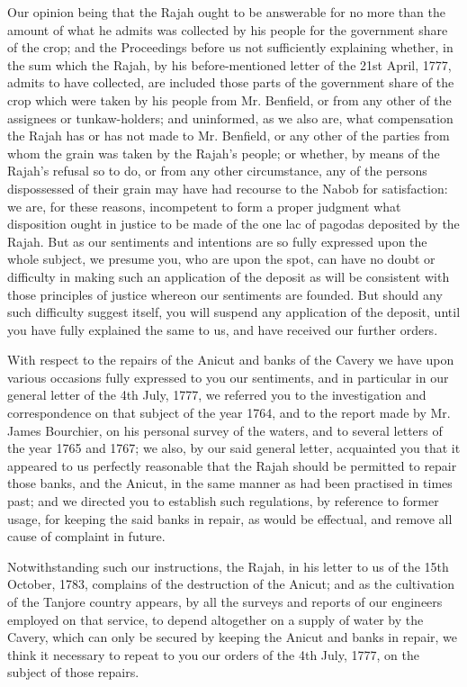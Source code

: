 Our opinion being that the Rajah ought to be answerable for no more than the amount of what he admits was collected by his people for the government share of the crop; and the Proceedings before us not sufficiently explaining whether, in the sum which the Rajah, by his before-mentioned letter of the 21st April, 1777, admits to have collected, are included those parts of the government share of the crop which were taken by his people from Mr. Benfield, or from any other of the assignees or tunkaw-holders; and uninformed, as we also are, what compensation the Rajah has or has not made to Mr. Benfield, or any other of the parties from whom the grain was taken by the Rajah's people; or whether, by means of the Rajah's refusal so to do, or from any other circumstance, any of the persons dispossessed of their grain may have had recourse to the Nabob for satisfaction: we are, for these reasons, incompetent to form a proper judgment what disposition ought in justice to be made of the one lac of pagodas deposited by the Rajah. But as our sentiments and intentions are so fully expressed upon the whole subject, we presume you, who are upon the spot, can have no doubt or difficulty in making such an application of the deposit as will be consistent with those principles of justice whereon our sentiments are founded. But should any such difficulty suggest itself, you will suspend any application of the deposit, until you have fully explained the same to us, and have received our further orders.

With respect to the repairs of the Anicut and banks of the Cavery we have upon various occasions fully expressed to you our sentiments, and in particular in our general letter of the 4th July, 1777, we referred you to the investigation and correspondence on that subject of the year 1764, and to the report made by Mr. James Bourchier, on his personal survey of the waters, and to several letters of the year 1765 and 1767; we also, by our said general letter, acquainted you that it appeared to us perfectly reasonable that the Rajah should be permitted to repair those banks, and the Anicut, in the same manner as had been practised in times past; and we directed you to establish such regulations, by reference to former usage, for keeping the said banks in repair, as would be effectual, and remove all cause of complaint in future.

Notwithstanding such our instructions, the Rajah, in his letter to us of the 15th October, 1783, complains of the destruction of the Anicut; and as the cultivation of the Tanjore country appears, by all the surveys and reports of our engineers employed on that service, to depend altogether on a supply of water by the Cavery, which can only be secured by keeping the Anicut and banks in repair, we think it necessary to repeat to you our orders of the 4th July, 1777, on the subject of those repairs.

